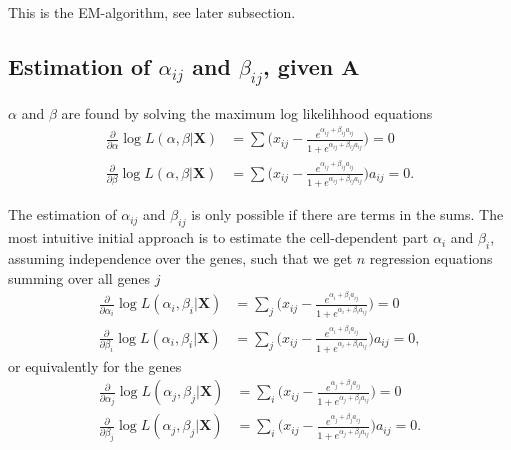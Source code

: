 \documentclass[12pt]{article}
\begin{document}
This is the EM-algorithm, see later subsection.

\subsection{Estimation of $\alpha_{ij}$ and $\beta_{ij}$, given $\mathbf{A}$} \label{sec:EstimatingAlphaBeta}%

$\alpha$ and $\beta$ are found by solving the maximum log likelihhood equations
\begin{align} \label{eq:AlphaBeta}
  \frac{\partial}{\partial \alpha} \log L(\alpha, \beta|\mathbf{X}) &= \sum \big (x_{i j} - \frac{e^{\alpha_{ij} + \beta_{ij} a_{ij}}}{1 + e^{\alpha_{ij} + \beta_{ij} a_{ij}}} \big) = 0 \\
  \frac{\partial}{\partial \beta} \log L(\alpha, \beta|\mathbf{X}) &= \sum \big (x_{i j} - \frac{e^{\alpha_{ij} + \beta_{ij} a_{ij}}}{1 + e^{\alpha_{ij} + \beta_{ij} a_{ij}}} \big )a_{ij} = 0. \nonumber
\end{align}

The estimation of $\alpha_{ij}$ and $\beta_{ij}$ is only possible if there are terms in the sums.
The most intuitive initial approach is to estimate the cell-dependent part  $\alpha_{i}$ and $\beta_{i}$, assuming independence over the genes, such that we get $n$ regression equations summing over all genes $j$
\begin{align}
  \frac{\partial}{\partial \alpha_i} \log L(\alpha_i, \beta_i|\mathbf{X}) &= \sum_j \big (x_{i j} - \frac{e^{\alpha_{i} + \beta_{i} a_{ij}}}{1 + e^{\alpha_{i} + \beta_{i} a_{ij}}} \big) = 0  \label{eq:Alpha_cell} \\
  \frac{\partial}{\partial \beta_i} \log L(\alpha_i, \beta_i|\mathbf{X}) &= \sum_j \big (x_{i j} - \frac{e^{\alpha_{i} + \beta_{i} a_{ij}}}{1 + e^{\alpha_{i} + \beta_{i} a_{ij}}} \big )a_{ij} = 0,  \label{eq:Beta_cell}
\end{align}
or equivalently for the genes
\begin{align} \label{eq:AlphaBeta_gene}
  \frac{\partial}{\partial \alpha_j} \log L(\alpha_j, \beta_j|\mathbf{X}) &= \sum_i \big (x_{i j} - \frac{e^{\alpha_{j} + \beta_{j} a_{ij}}}{1 + e^{\alpha_{j} + \beta_{j} a_{ij}}} \big) = 0 \\
  \frac{\partial}{\partial \beta_j} \log L(\alpha_j, \beta_j|\mathbf{X}) &= \sum_i \big (x_{i j} - \frac{e^{\alpha_{j} + \beta_{j} a_{ij}}}{1 + e^{\alpha_{j} + \beta_{j} a_{ij}}} \big )a_{ij} = 0. \nonumber
\end{align}
\end{document}
